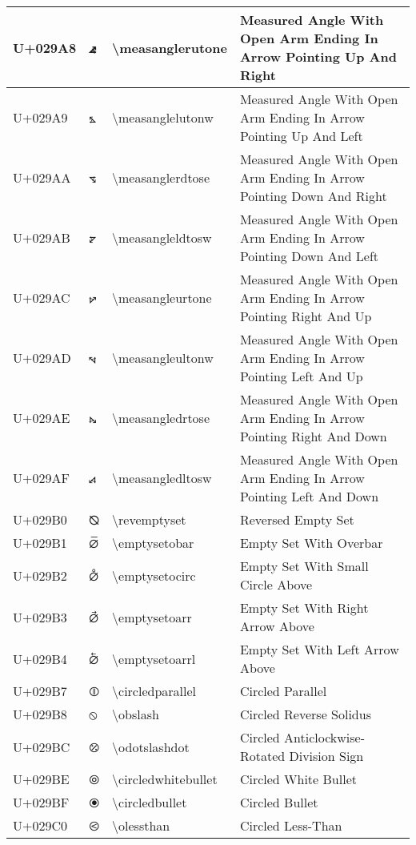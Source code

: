 \begin{table}[h]
\begin{tabulary}{\linewidth}{|L|L|L|L|}
\hline
U+029A8 & ⦨ & {\textbackslash}measanglerutone & Measured Angle With Open Arm Ending In Arrow Pointing Up And Right \\
\hline
U+029A9 & ⦩ & {\textbackslash}measanglelutonw & Measured Angle With Open Arm Ending In Arrow Pointing Up And Left \\
\hline
U+029AA & ⦪ & {\textbackslash}measanglerdtose & Measured Angle With Open Arm Ending In Arrow Pointing Down And Right \\
\hline
U+029AB & ⦫ & {\textbackslash}measangleldtosw & Measured Angle With Open Arm Ending In Arrow Pointing Down And Left \\
\hline
U+029AC & ⦬ & {\textbackslash}measangleurtone & Measured Angle With Open Arm Ending In Arrow Pointing Right And Up \\
\hline
U+029AD & ⦭ & {\textbackslash}measangleultonw & Measured Angle With Open Arm Ending In Arrow Pointing Left And Up \\
\hline
U+029AE & ⦮ & {\textbackslash}measangledrtose & Measured Angle With Open Arm Ending In Arrow Pointing Right And Down \\
\hline
U+029AF & ⦯ & {\textbackslash}measangledltosw & Measured Angle With Open Arm Ending In Arrow Pointing Left And Down \\
\hline
U+029B0 & ⦰ & {\textbackslash}revemptyset & Reversed Empty Set \\
\hline
U+029B1 & ⦱ & {\textbackslash}emptysetobar & Empty Set With Overbar \\
\hline
U+029B2 & ⦲ & {\textbackslash}emptysetocirc & Empty Set With Small Circle Above \\
\hline
U+029B3 & ⦳ & {\textbackslash}emptysetoarr & Empty Set With Right Arrow Above \\
\hline
U+029B4 & ⦴ & {\textbackslash}emptysetoarrl & Empty Set With Left Arrow Above \\
\hline
U+029B7 & ⦷ & {\textbackslash}circledparallel & Circled Parallel \\
\hline
U+029B8 & ⦸ & {\textbackslash}obslash & Circled Reverse Solidus \\
\hline
U+029BC & ⦼ & {\textbackslash}odotslashdot & Circled Anticlockwise-Rotated Division Sign \\
\hline
U+029BE & ⦾ & {\textbackslash}circledwhitebullet & Circled White Bullet \\
\hline
U+029BF & ⦿ & {\textbackslash}circledbullet & Circled Bullet \\
\hline
U+029C0 & ⧀ & {\textbackslash}olessthan & Circled Less-Than \\

\end{tabulary}
\end{table}
